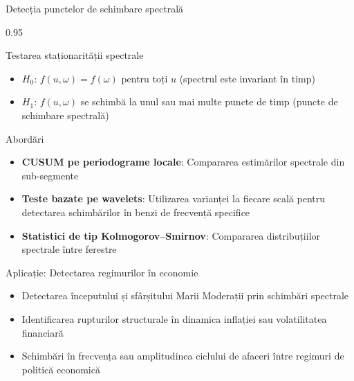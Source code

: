 \documentclass[9pt, aspectratio=169, t]{beamer}
\begin{document}
\begin{frame}{Detecția punctelor de schimbare spectrală}
    \begin{cminipage}{0.95\textwidth}
    \vspace{-2mm}
    \begin{block}{Testarea staționarității spectrale}
        {\small
        \begin{itemize}\setlength{\itemsep}{0pt}
            \item $H_0$: $f(u, \omega) = f(\omega)$ pentru toți $u$ \quad (spectrul este invariant în timp)
            \item $H_1$: $f(u, \omega)$ se schimbă la unul sau mai multe puncte de timp (puncte de schimbare spectrală)
        \end{itemize}
        }
    \end{block}
    \vspace{-2mm}
    \begin{exampleblock}{Abordări}
        \begin{itemize}\setlength{\itemsep}{0pt}
            \item \textbf{CUSUM pe periodograme locale}: Compararea estimărilor spectrale din sub-segmente
            \item \textbf{Teste bazate pe wavelets}: Utilizarea varianței la fiecare scală pentru detectarea schimbărilor în benzi de frecvență specifice
            \item \textbf{Statistici de tip Kolmogorov--Smirnov}: Compararea distribuțiilor spectrale între ferestre
        \end{itemize}
    \end{exampleblock}
    \vspace{-2mm}
    \begin{alertblock}{Aplicație: Detectarea regimurilor în economie}
        \begin{itemize}\setlength{\itemsep}{0pt}
            \item Detectarea începutului și sfârșitului Marii Moderații prin schimbări spectrale
            \item Identificarea rupturilor structurale în dinamica inflației sau volatilitatea financiară
            \item Schimbări în frecvența sau amplitudinea ciclului de afaceri între regimuri de politică economică
        \end{itemize}
    \end{alertblock}
    \end{cminipage}
\end{frame}
\end{document}
